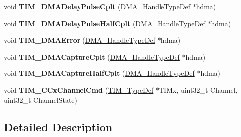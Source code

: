 \begin{DoxyCompactItemize}
\mbox{\label{group___t_i_m___private___functions_ga78edd2f05a873d68690d8658aa427ccf}} 
void {\bfseries T\+I\+M\+\_\+\+D\+M\+A\+Delay\+Pulse\+Cplt} (\mbox{\hyperlink{group___d_m_a___exported___types_ga41b754a906b86bce54dc79938970138b}{D\+M\+A\+\_\+\+Handle\+Type\+Def}} $\ast$hdma)
\item 
\mbox{\label{group___t_i_m___private___functions_ga8bfc333f26980f4e473a75cdb45de292}} 
void {\bfseries T\+I\+M\+\_\+\+D\+M\+A\+Delay\+Pulse\+Half\+Cplt} (\mbox{\hyperlink{group___d_m_a___exported___types_ga41b754a906b86bce54dc79938970138b}{D\+M\+A\+\_\+\+Handle\+Type\+Def}} $\ast$hdma)
\item 
\mbox{\label{group___t_i_m___private___functions_gaa112bee5279feee040c1ea9e283f7378}} 
void {\bfseries T\+I\+M\+\_\+\+D\+M\+A\+Error} (\mbox{\hyperlink{group___d_m_a___exported___types_ga41b754a906b86bce54dc79938970138b}{D\+M\+A\+\_\+\+Handle\+Type\+Def}} $\ast$hdma)
\item 
\mbox{\label{group___t_i_m___private___functions_ga60b9c315720fddb3db32299f05f7d712}} 
void {\bfseries T\+I\+M\+\_\+\+D\+M\+A\+Capture\+Cplt} (\mbox{\hyperlink{group___d_m_a___exported___types_ga41b754a906b86bce54dc79938970138b}{D\+M\+A\+\_\+\+Handle\+Type\+Def}} $\ast$hdma)
\item 
\mbox{\label{group___t_i_m___private___functions_ga2c2f2f092eaa9414661422f06fdc56a0}} 
void {\bfseries T\+I\+M\+\_\+\+D\+M\+A\+Capture\+Half\+Cplt} (\mbox{\hyperlink{group___d_m_a___exported___types_ga41b754a906b86bce54dc79938970138b}{D\+M\+A\+\_\+\+Handle\+Type\+Def}} $\ast$hdma)
\item 
\mbox{\label{group___t_i_m___private___functions_ga7fcc6d5ca311c37f5d0250687c899924}} 
void {\bfseries T\+I\+M\+\_\+\+C\+Cx\+Channel\+Cmd} (\mbox{\hyperlink{struct_t_i_m___type_def}{T\+I\+M\+\_\+\+Type\+Def}} $\ast$T\+I\+Mx, uint32\+\_\+t Channel, uint32\+\_\+t Channel\+State)
\end{DoxyCompactItemize}


\subsection{Detailed Description}
